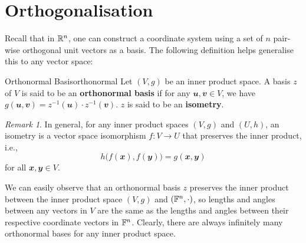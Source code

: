 \documentclass[math, code]{amznotes}
\theoremstyle{remark}
\newtheorem*{remark}{Remark}
\begin{document}
\section{Orthogonalisation}
Recall that in $\mathbb{R}^n$, one can construct a coordinate system using a set of $n$ pair-wise orthogonal unit vectors as a basis. The following definition helps generalise this to any vector space:
\begin{dfnbox}{Orthonormal Basis}{orthonormal}
    Let $(V, g)$ be an inner product space. A basis $z$ of $V$ is said to be an {\color{red} \textbf{orthonormal basis}} if for any $\mathbfit{u}, \mathbfit{v} \in V$, we have $g(\mathbfit{u}, \mathbfit{v}) = z^{-1}(\mathbfit{u}) \cdot z^{-1}(\mathbfit{v})$. $z$ is said to be an {\color{red} \textbf{isometry}}.
\end{dfnbox}
\begin{notebox}
    \begin{remark}
        In general, for any inner product spaces $(V, g)$ and $(U, h)$, an isometry is a vector space isomorphism $f \colon V \to U$ that preserves the inner product, i.e., 
        \begin{equation*}
            h\bigl(f(\mathbfit{x}), f(\mathbfit{y})\bigr) = g(\mathbfit{x}, \mathbfit{y})
        \end{equation*}
        for all $\mathbfit{x}, \mathbfit{y} \in V$. 
    \end{remark}
\end{notebox}
    We can easily observe that an orthonormal basis $z$ preserves the inner product between the inner product space $(V, g)$ and $(\mathbb{F}^n, \cdot)$, so lengths and angles between any vectors in $V$ are the same as the lengths and angles between their respective coordinate vectors in $\mathbb{F}^n$. Clearly, there are always infinitely many orthonormal bases for any inner product space.
\end{document}
